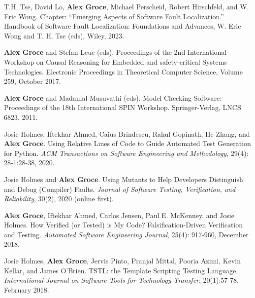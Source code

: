 \documentclass[ComputerScience]{vita}
\begin{document}
\begin{vita}
\begin{Books, Chapters, Edited Volumes}

\item
T.H. Tse, David Lo, {\bf Alex Groce}, Michael Perscheid, Robert Hirschfeld,
and W. Eric Wong.
\newblock Chapter: ``Emerging Aspects of Software Fault Localization.''
\newblock Handbook of Software Fault Localization: Foundations and Advances, W. Eric Wong and T. H. Tse (eds), Wiley, 2023.
  
\item
{\bf Alex Groce} and Stefan Leue (eds).
\newblock Proceedings of the 2nd International Workshop on 
Causal Reasoning for Embedded and safety-critical Systems Technologies.
\newblock Electronic Proceedings in Theoretical Computer Science, Volume 259, October 2017.

\item
{\bf Alex Groce} and Madanlal Musuvathi (eds).
\newblock Model Checking Software: Proceedings of the 18th International SPIN Workshop.
\newblock Springer-Verlag, LNCS 6823, 2011. 

\end{Books, Chapters, Edited Volumes}

\begin{Refereed Journal Publications}
\item
Josie Holmes, Iftekhar Ahmed, Caius Brindescu, Rahul Gopinath, He
Zhang, and {\bf Alex Groce}.
\newblock Using Relative Lines of Code to Guide Automated Test
Generation for Python.
\newblock \emph{ACM Transactions on Software Engineering and
  Methodology}, 29(4): 28-1:28-38, 2020.
  
\item
Josie Holmes and {\bf Alex Groce}.
\newblock Using Mutants to Help Developers Distinguish and Debug (Compiler) Faults.
\newblock \emph{Journal of Software Testing, Verification, and
  Reliability}, 30(2), 2020 (online first).

\item
{\bf Alex Groce}, Iftekhar Ahmed, Carlos Jensen, Paul E. McKenney, and
Josie Holmes.
\newblock How Verified (or Tested) is My Code? Falsification-Driven Verification and Testing.
\newblock \emph{Automated Software Engineering Journal}, 25(4):
917-960, December 2018.

\item
Josie Holmes, {\bf Alex Groce}, Jervis Pinto, Pranjal Mittal, Pooria Azimi, Kevin Kellar, and James O'Brien.
\newblock TSTL: the Template Scripting Testing Language.
\newblock \emph{International Journal on Software Tools for Technology Transfer}, 20(1):57-78, February 2018.



\end{Refereed Journal Publications}
\end{vita}
\end{document}
